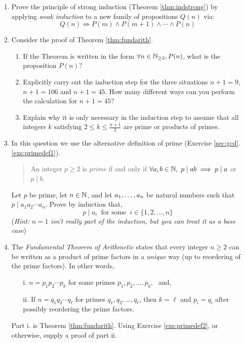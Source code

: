 \begin{exercises}{}{}
\begin{enumerate}
	
		\item\label{exs:strongindproof} Prove the principle of strong induction (Theorem \ref{thm:indstrong}) by applying \emph{weak induction} to a new family of propositions $Q(n)$ via:
		\[
			Q(n)\iff P(m)\wedge P(m+1)\wedge\cdots\wedge P(n)
		\]
	
	
		\item Consider the proof of Theorem \ref{thm:fundarith}.
		\begin{enumerate}
	  	\item If the Theorem is written in the form $\forall n\in\mathbb{N}_{\ge 2}, P(n)$, what is the proposition $P(n)$?
	  	\item Explicitly carry out the induction step for the three situations $n+1=9$, $n+1=106$ and $n+1=45$. How many different ways can you perform the calculation for $n+1=45$? 
	  	\item Explain why it is only necessary in the induction step to assume that all integers $k$ satisfying $2\le k\le\frac{n+1}2$ are prime or products of primes.
		\end{enumerate}

		\item\label{exs:primedef2} In this question we use the alternative definition of prime (Exercise \ref*{sec:gcd}.\ref{exs:primedef1}).\footnotemark
		\begin{quote}
			An integer $p\ge 2$ is \emph{prime} if and only if $\forall a,b\in\mathbb{N},\ p\mid ab\implies p\mid a$ or $p\mid b$.
		\end{quote}
		Let $p$ be prime, let $n\in\mathbb{N}$, and let ${a}_1,\ldots,{a}_{n}$ be natural numbers such that $p\mid a_1a_2\cdots a_n$. Prove by induction that,
		\[
			p\mid a_i\ \text{ for some }\ i\in\{1,2,\ldots,n\}
		\]
	  (\emph{Hint: $n=1$ isn't really part of the induction, but you can treat it as a base case})
	  
	    
	  \item The \emph{Fundamental Theorem of Arithmetic} states that every integer $n\ge 2$ can be written as a product of prime factors in a \emph{unique} way (up to reordering of the prime factors). In other words, 
		\begin{itemize}
	    \item[i.] $n=p_1p_2\cdots p_k$ for some primes $p_1,p_2,\ldots,p_k$, \ and,
	    \item[ii.] If $n=q_1q_2\cdots q_\ell$ for primes $q_1,q_2,\ldots,q_\ell$, then $k=\ell$ and $p_i=q_i$ after possibly reordering the prime factors. 
		\end{itemize}
	  Part i.{} is Theorem \ref{thm:fundarith}. Using Exercise \ref{exs:primedef2}, or otherwise, supply a proof of part ii.
		
	\end{enumerate}
\end{exercises}


